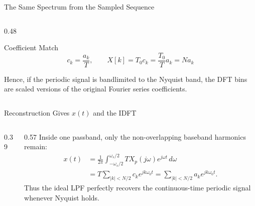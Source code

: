 \begin{frame}{The Same Spectrum from the Sampled Sequence}
\begin{columns}[T]
\begin{column}{0.48\textwidth}
      \vspace{0.12cm}
      \begin{conceptbox}{Coefficient Match}
        \vspace{-0.2cm}
        \begin{equation*}
          c_k=\frac{a_k}{T}, \qquad X[k]=T_0c_k=\frac{T_0}{T}a_k=Na_k
        \end{equation*}
      \end{conceptbox}
      {\footnotesize Hence, if the periodic signal is bandlimited to the Nyquist band, the DFT bins are scaled versions of the original Fourier series coefficients.}
    \end{column}
  \end{columns}
\end{frame}

\begin{frame}{Reconstruction Gives $x(t)$ and the IDFT}
  \begin{columns}[T]
    \begin{column}{0.39\textwidth}
      \centering
    \end{column}

    \begin{column}{0.57\textwidth}
      \footnotesize
      Inside one passband, only the non-overlapping baseband harmonics remain:
      \begin{align*}
        x(t)
        &= \frac{1}{2\pi}\int_{-\omega_s/2}^{\omega_s/2} T X_p(j\omega)e^{j\omega t}\,d\omega \\
        &= T\sum_{|k|<N/2} c_k e^{jk\omega_0 t}
        = \sum_{|k|<N/2} a_k e^{jk\omega_0 t}.
      \end{align*}
      Thus the ideal LPF perfectly recovers the continuous-time periodic signal whenever Nyquist holds.


\end{column}
\end{columns}
\end{frame}
